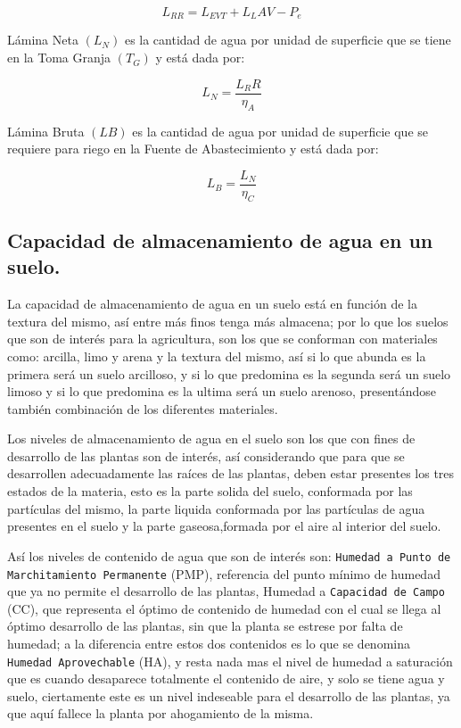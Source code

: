 \begin{equation}
	L_{RR} = L_{EVT} + L_LAV-P_e
\end{equation}

Lámina Neta $(L_N)$ es la cantidad de agua por unidad de superficie que se tiene en
la Toma Granja $(T_G)$ y está dada por:

\begin{equation}
	L_N= \frac{L_RR}{\eta_A}
\end{equation}

Lámina Bruta $(LB)$ es la cantidad de agua por unidad de superficie que se
requiere para riego en la Fuente de Abastecimiento y está dada por:

\begin{equation}
	L_B=\frac{L_N}{\eta_C}
\end{equation}


\subsection{Capacidad de almacenamiento de agua en un suelo.}

La capacidad de almacenamiento de agua en un suelo está en función de la
textura del mismo, así entre más finos tenga más almacena; por lo que los suelos que
son de interés para la agricultura, son los que se conforman con materiales como:
arcilla, limo y arena y la textura del mismo, así si lo que abunda es la primera será un
suelo arcilloso, y si lo que predomina es la segunda será un suelo limoso y si lo que
predomina es la ultima será un suelo arenoso, presentándose también combinación de
los diferentes materiales.

Los niveles de almacenamiento de agua en el suelo son los que con fines de
desarrollo de las plantas son de interés, así considerando que para que se desarrollen
adecuadamente las raíces de las plantas, deben estar presentes los tres estados de la
materia, esto es la parte solida del suelo, conformada por las partículas del mismo, la
parte liquida conformada por las partículas de agua presentes en el suelo y la parte
gaseosa,formada por el aire al interior del suelo.

Así los niveles de contenido de agua que son de interés son: \texttt{Humedad a Punto
	de Marchitamiento Permanente} (PMP), referencia del punto mínimo de humedad que ya
no permite el desarrollo de las plantas, Humedad a \texttt{Capacidad de Campo} (CC), que
representa el óptimo de contenido de humedad con el cual se llega al óptimo desarrollo
de las plantas, sin que la planta se estrese por falta de humedad; a la diferencia entre
estos dos contenidos es lo que se denomina \texttt{Humedad Aprovechable} (HA), y resta nada
mas el nivel de humedad a saturación que es cuando desaparece totalmente el
contenido de aire, y solo se tiene agua y suelo, ciertamente este es un nivel indeseable
para el desarrollo de las plantas, ya que aquí fallece la planta por ahogamiento de la
misma.

